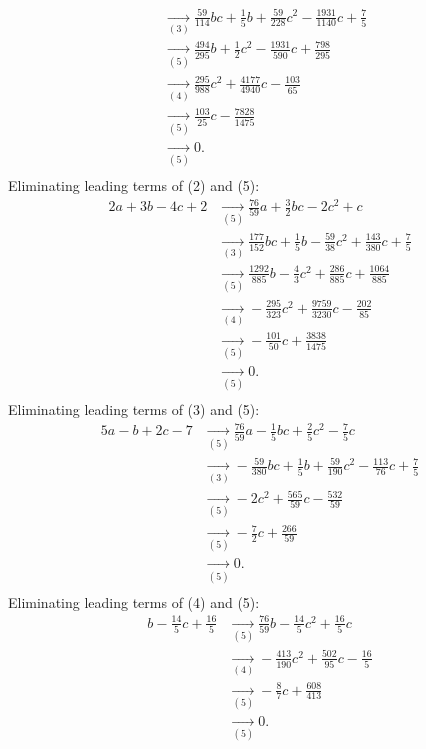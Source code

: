 {\begin{align*}
\\ &\underset{(3)}{\rightarrow}\frac{59}{114}bc+\frac{1}{5}b+\frac{59}{228}c^{2}-\frac{1931}{1140}c+\frac{7}{5}
\\ &\underset{(5)}{\rightarrow}\frac{494}{295}b+\frac{1}{2}c^{2}-\frac{1931}{590}c+\frac{798}{295}
\\ &\underset{(4)}{\rightarrow}\frac{295}{988}c^{2}+\frac{4177}{4940}c-\frac{103}{65}
\\ &\underset{(5)}{\rightarrow}\frac{103}{25}c-\frac{7828}{1475}
\\ &\underset{(5)}{\rightarrow}0
.\\ \end{align*}
Eliminating leading terms of (2) and (5):
\begin{align*}
2a+3b-4c+2&\underset{(5)}{\rightarrow}\frac{76}{59}a+\frac{3}{2}bc-2c^{2}+c
\\ &\underset{(3)}{\rightarrow}\frac{177}{152}bc+\frac{1}{5}b-\frac{59}{38}c^{2}+\frac{143}{380}c+\frac{7}{5}
\\ &\underset{(5)}{\rightarrow}\frac{1292}{885}b-\frac{4}{3}c^{2}+\frac{286}{885}c+\frac{1064}{885}
\\ &\underset{(4)}{\rightarrow}-\frac{295}{323}c^{2}+\frac{9759}{3230}c-\frac{202}{85}
\\ &\underset{(5)}{\rightarrow}-\frac{101}{50}c+\frac{3838}{1475}
\\ &\underset{(5)}{\rightarrow}0
.\\ \end{align*}
Eliminating leading terms of (3) and (5):
\begin{align*}
5a-b+2c-7&\underset{(5)}{\rightarrow}\frac{76}{59}a-\frac{1}{5}bc+\frac{2}{5}c^{2}-\frac{7}{5}c
\\ &\underset{(3)}{\rightarrow}-\frac{59}{380}bc+\frac{1}{5}b+\frac{59}{190}c^{2}-\frac{113}{76}c+\frac{7}{5}
\\ &\underset{(5)}{\rightarrow}-2c^{2}+\frac{565}{59}c-\frac{532}{59}
\\ &\underset{(5)}{\rightarrow}-\frac{7}{2}c+\frac{266}{59}
\\ &\underset{(5)}{\rightarrow}0
.\\ \end{align*}
Eliminating leading terms of (4) and (5):
\begin{align*}
b-\frac{14}{5}c+\frac{16}{5}&\underset{(5)}{\rightarrow}\frac{76}{59}b-\frac{14}{5}c^{2}+\frac{16}{5}c
\\ &\underset{(4)}{\rightarrow}-\frac{413}{190}c^{2}+\frac{502}{95}c-\frac{16}{5}
\\ &\underset{(5)}{\rightarrow}-\frac{8}{7}c+\frac{608}{413}
\\ &\underset{(5)}{\rightarrow}0
.\\ \end{align*}
}